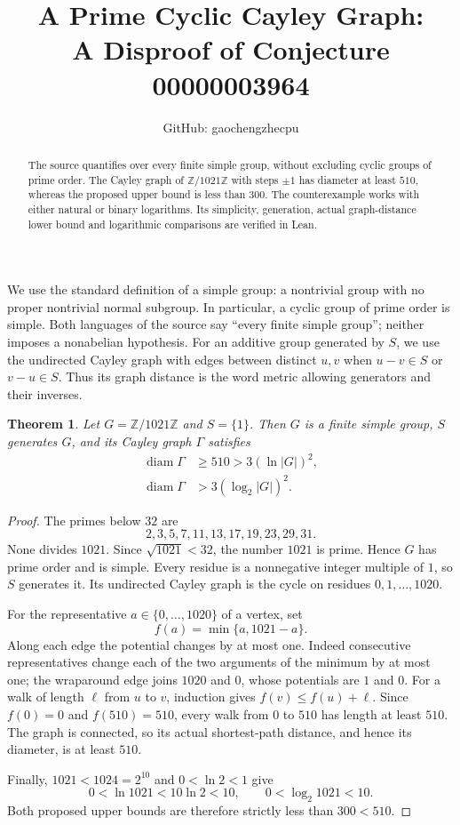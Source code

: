 \documentclass[11pt]{article}
\title{A Prime Cyclic Cayley Graph:\\A Disproof of Conjecture 00000003964}
\author{GitHub: gaochengzhecpu}
\date{}
\newtheorem{theorem}{Theorem}
\begin{document}
\maketitle
\begin{abstract}
The source quantifies over every finite simple group, without excluding
cyclic groups of prime order. The Cayley graph of $\mathbb Z/1021\mathbb Z$
with steps $\pm1$ has diameter at least $510$, whereas the proposed upper
bound is less than $300$. The counterexample works with either natural
or binary logarithms. Its simplicity, generation, actual graph-distance
lower bound and logarithmic comparisons are verified in Lean.
\end{abstract}

We use the standard definition of a simple group: a nontrivial group
with no proper nontrivial normal subgroup. In particular, a cyclic group
of prime order is simple. Both languages of the source say ``every finite
simple group''; neither imposes a nonabelian hypothesis. For an additive
group generated by $S$, we use the undirected Cayley graph with edges
between distinct $u,v$ when $u-v\in S$ or $v-u\in S$. Thus its graph
distance is the word metric allowing generators and their inverses.

\begin{theorem}
Let $G=\mathbb Z/1021\mathbb Z$ and $S=\{1\}$. Then $G$ is a finite
simple group, $S$ generates $G$, and its Cayley graph $\Gamma$ satisfies
\[
 \begin{aligned}
 \operatorname{diam}\Gamma&\ge510>3(\ln |G|)^2,\\
 \operatorname{diam}\Gamma&>3(\log_2 |G|)^2.
 \end{aligned}
\]
\end{theorem}
\begin{proof}
The primes below $32$ are
\[
 2,3,5,7,11,13,17,19,23,29,31.
\]
None divides $1021$. Since $\sqrt{1021}<32$, the number $1021$ is prime.
Hence $G$ has prime order and is simple. Every residue is a nonnegative integer multiple
of $1$, so $S$ generates it. Its undirected Cayley graph is the cycle
on residues $0,1,\ldots,1020$.

For the representative $a\in\{0,\ldots,1020\}$ of a vertex, set
\[
 f(a)=\min\{a,1021-a\}.
\]
Along each edge the potential changes by at most one. Indeed consecutive
representatives change each of the two arguments of the minimum by at
most one; the wraparound edge joins $1020$ and $0$, whose potentials are
$1$ and $0$. For a walk of length $\ell$ from $u$ to $v$, induction gives
$f(v)\le f(u)+\ell$. Since $f(0)=0$ and $f(510)=510$, every walk from
$0$ to $510$ has length at least $510$. The graph is connected, so its
actual shortest-path distance, and hence its diameter, is at least $510$.

Finally, $1021<1024=2^{10}$ and $0<\ln2<1$ give
\[
 0<\ln1021<10\ln2<10,\qquad 0<\log_2 1021<10.
\]
Both proposed upper bounds are therefore strictly less than $300<510$.
\end{proof}
\end{document}
